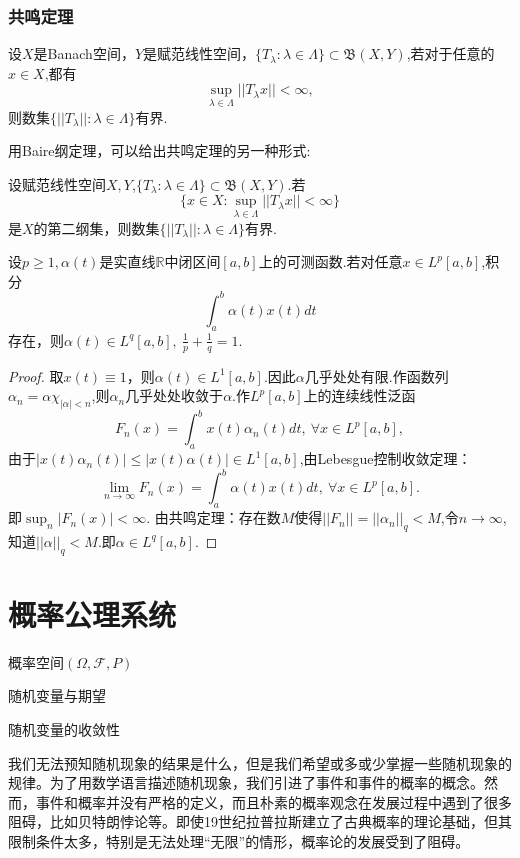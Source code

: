 \documentclass[lang=cn,10pt]{elegantbook}
\begin{document}
	\subsection{共鸣定理}
	\begin{theorem}
		设\(X\)是Banach空间，\(Y\)是赋范线性空间，\(\{T_\lambda:\lambda\in \Lambda\}\subset \mathfrak{B}(X,Y)\),若对于任意的\(x\in X\),都有
		\[\sup_{\lambda\in \Lambda}||T_\lambda x||<\infty,\]
		则数集\(\{||T_\lambda||:\lambda\in \Lambda\}\)有界.
		
		用Baire纲定理，可以给出共鸣定理的另一种形式:
		
		设赋范线性空间\(X,Y\),\(\{T_\lambda:\lambda\in \Lambda\}\subset \mathfrak{B}(X,Y)\).若
		\[\{x\in X:\sup_{\lambda\in \Lambda}||T_\lambda x||<\infty\}\]
		是\(X\)的第二纲集，则数集\(\{||T_\lambda||:\lambda\in \Lambda\}\)有界.
	\end{theorem}
	\begin{example}
		设\(p\ge 1,\alpha(t)\)是实直线\(\mathbb{R}\)中闭区间\([a,b]\)上的可测函数.若对任意\(x\in L^p[a,b]\),积分
		\[\int_{a}^{b}\alpha(t)x(t)dt\]
		存在，则\(\alpha(t)\in L^q[a,b],\ \frac{1}{p}+\frac{1}{q}=1.\)
	\end{example}
	\begin{proof}
		取\(x(t)\equiv 1\)，则\(\alpha(t)\in L^1[a,b]\).因此\(\alpha\)几乎处处有限.作函数列\(\alpha_n=\alpha\chi_{|\alpha|<n}\),则\(\alpha_n\)几乎处处收敛于\(\alpha.\)作\(L^p[a,b]\)上的连续线性泛函
			\[F_n(x)=\int_{a}^{b}x(t)\alpha_n(t)dt,\ \forall x\in L^p[a,b],\]
			由于\(|x(t)\alpha_n(t)|\le |x(t)\alpha(t)|\in L^1[a,b]\),由Lebesgue控制收敛定理：
			\[\lim_{n\to \infty}F_n(x)=\int_{a}^{b}\alpha(t)x(t)dt,\ \forall x\in L^p[a,b].\]
			即\(\sup_n |F_n(x)|< \infty.\)
			由共鸣定理：存在数\(M\)使得\(||F_n||=||\alpha_n||_q<M\),令\(n\to \infty\),知道\(||\alpha||_q<M.\)即\(\alpha \in L^q[a,b]\).
	\end{proof}
	
	\chapter{概率公理系统}
	\begin{introduction}
		\item 概率空间\((\Omega,\mathcal{F},P)\)
		\item 随机变量与期望
		\item 随机变量的收敛性
	\end{introduction}
	我们无法预知随机现象的结果是什么，但是我们希望或多或少掌握一些随机现象的规律。为了用数学语言描述随机现象，我们引进了事件和事件的概率的概念。然而，事件和概率并没有严格的定义，而且朴素的概率观念在发展过程中遇到了很多阻碍，比如贝特朗悖论等。即使19世纪拉普拉斯建立了古典概率的理论基础，但其限制条件太多，特别是无法处理“无限”的情形，概率论的发展受到了阻碍。
	
\end{document}
